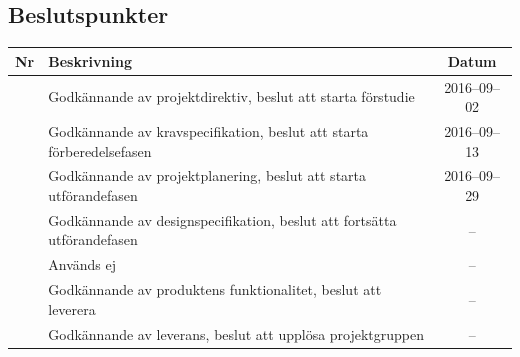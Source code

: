 \documentclass[a4paper,titlepage,12pt]{article}
\newcounter{bpNr}
\newcommand{\nextBPNr}{\stepcounter{bpNr}\arabic{bpNr}}
\begin{document}
	
	\subsection{Beslutspunkter}
	\renewcommand*{\arraystretch}{1.4}
	\begin{longtable}[c]{ c l c}
		\textbf{Nr} & \textbf{Beskrivning} & \textbf{Datum} \\ \midrule
		\nextBPNr{} & Godkännande av projektdirektiv, beslut att starta förstudie & 2016--09--02 \\ \midrule
		\nextBPNr{} & Godkännande av kravspecifikation, beslut att starta förberedelsefasen & 2016--09--13 \\ \midrule
		\nextBPNr{} & Godkännande av projektplanering, beslut att starta utförandefasen & 2016--09--29 \\ \midrule
		\nextBPNr{} & Godkännande av designspecifikation, beslut att fortsätta
        utförandefasen & -- \\ \midrule
		\nextBPNr{} & Används ej & -- \\ \midrule
		\nextBPNr{} & Godkännande av produktens funktionalitet, beslut att leverera & -- \\ \midrule
		\nextBPNr{} & Godkännande av leverans, beslut att upplösa projektgruppen & -- \\ \midrule
	\end{longtable}
	
	
\end{document}
